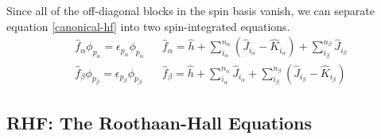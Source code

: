 \documentclass[11pt,fleqn]{article}
\renewcommand{\a}{\alpha}    %
\renewcommand{\b}{\beta}     %
\newcommand{\ev}{\epsilon}   %
\newcommand{\f}{\phi}        %
\newcommand{\op}[1]{\ensuremath{\hat{#1}}}
\theoremstyle{mystyle}
\begin{document}
Since all of the off-diagonal blocks in the spin basis vanish, we can separate equation \ref{canonical-hf} into two spin-integrated equations.
\begin{align}
\label{canonical-uhf-equation-alpha}
&
  \op{f}_\a \f_{p_\a}
=
  \ev_{p_\a} \f_{p_\a}
&&
  \op{f}_\a
=
  \op{h}
+
  \sum_{i_\a}^{n_\a}
  (\op{J}_{i_\a} - \op{K}_{i_\a})
+
  \sum_{i_\b}^{n_\b}
  \op{J}_{i_\b}
\\
\label{canonical-uhf-equation-beta}
&
  \op{f}_\b \f_{p_\b}
=
  \ev_{p_\b} \f_{p_\b}
&&
  \op{f}_\b
=
  \op{h}
+
  \sum_{i_\a}^{n_\a}
  \op{J}_{i_\a}
+
  \sum_{i_\b}^{n_\b}
  (\op{J}_{i_\b} - \op{K}_{i_\b})
\end{align}


\subsection*{RHF: The Roothaan-Hall Equations}
\end{document}
